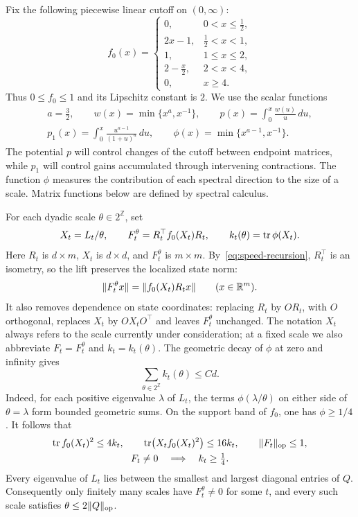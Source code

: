Fix the following piecewise linear cutoff on $(0,\infty)$:
\[
 f_0(x)=
 \begin{cases}
  0,&0<x\le\tfrac12,\\
  2x-1,&\tfrac12<x<1,\\
  1,&1\le x\le2,\\
  2-\tfrac{x}{2},&2<x<4,\\
  0,&x\ge4.
 \end{cases}
\]
Thus $0\le f_0\le1$ and its Lipschitz constant is $2$.
We use the scalar functions
\begin{equation}
 \begin{gathered}
 a=\tfrac32,\qquad
 w(x)=\min\{x^a,x^{-1}\},\qquad
 p(x)=\int_0^x\frac{w(u)}{u}\,du,\\
 p_1(x)=\int_0^x\frac{u^{a-1}}{(1+u)^a}\,du,
 \qquad
 \phi(x)=\min\{x^{a-1},x^{-1}\}.
 \end{gathered}
 \label{eq:scalar-potentials}
\end{equation}
The potential $p$ will control changes of the cutoff between endpoint
matrices, while $p_1$ will control gains accumulated through intervening
contractions.  The function $\phi$ measures the contribution of each
spectral direction to the size of a scale.  Matrix functions below are
defined by spectral calculus.

For each dyadic scale $\theta\in2^{\mathbb Z}$, set
\[
 X_t=L_t/\theta,
 \qquad
 F_t^\theta=R_t^\top f_0(X_t)R_t,
 \qquad
 k_t(\theta)=\operatorname{tr}\phi(X_t).
\]
Here $R_t$ is $d\times m$, $X_t$ is $d\times d$, and
$F_t^\theta$ is $m\times m$.  By~\eqref{eq:speed-recursion},
$R_t^\top$ is an isometry, so the lift preserves the localized state norm:
\[
 \lVert F_t^\theta x\rVert
 =\lVert f_0(X_t)R_tx\rVert\qquad(x\in\mathbb R^m).
\]
It also removes dependence on state coordinates: replacing $R_t$ by
$OR_t$, with $O$ orthogonal, replaces $X_t$ by $OX_tO^\top$ and leaves
$F_t^\theta$ unchanged.
The notation $X_t$ always refers to the scale currently under
consideration; at a fixed scale we also abbreviate $F_t=F_t^\theta$
and $k_t=k_t(\theta)$.
The geometric decay of $\phi$ at zero and infinity gives
\begin{equation}
 \sum_{\theta\in2^{\mathbb Z}}k_t(\theta)\le C d.
 \label{eq:scale-size}
\end{equation}
Indeed, for each positive eigenvalue $\lambda$ of $L_t$, the terms
$\phi(\lambda/\theta)$ on either side of $\theta=\lambda$ form
bounded geometric sums.  On the support band of $f_0$, one has
$\phi\ge1/4$.  It follows that
\begin{equation}
 \begin{gathered}
 \operatorname{tr} f_0(X_t)^2\le4k_t,
 \qquad
 \operatorname{tr}\bigl(X_tf_0(X_t)^2\bigr)\le16k_t,
 \qquad \lVert F_t\rVert_{\mathrm{op}}\le1,\\
 F_t\ne0\quad\Longrightarrow\quad k_t\ge\tfrac14.
 \end{gathered}
 \label{eq:cutoff-moments}
\end{equation}
Every eigenvalue of $L_t$ lies
between the smallest and largest diagonal entries of $Q$.
Consequently only finitely many scales have $F_t^\theta\ne0$ for some
$t$, and every such scale satisfies $\theta\le2\lVert Q\rVert_{\mathrm{op}}$.

